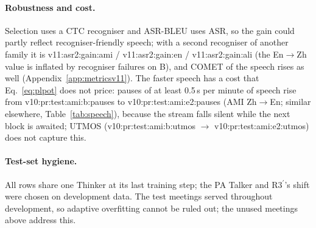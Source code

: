\paragraph{Robustness and cost.}\ifMetricsV{} Selection uses a CTC recogniser and ASR-BLEU uses ASR, so the gain could
partly reflect recogniser-friendly speech; with a second recogniser of another family it is
\num{v11:asr2:gain:ami} / \num{v11:asr2:gain:en} / \num{v11:asr2:gain:ali} (the En$\rightarrow$Zh value is inflated by
recogniser failures on B), and COMET of the speech rises as well (Appendix~\ref{app:metricsv11}).\fi{} The faster
speech has a cost that Eq.~\eqref{eq:plpot} does not price: pauses of at least 0.5\,s per minute of speech rise from
\num{v10:pr:test:ami:b:pauses} to \num{v10:pr:test:ami:e2:pauses} (AMI Zh$\rightarrow$En; similar elsewhere,
Table~\ref{tab:speech}), because the stream falls silent while the next block is awaited; UTMOS
(\num{v10:pr:test:ami:b:utmos} $\rightarrow$ \num{v10:pr:test:ami:e2:utmos}) does not capture this.

\paragraph{Test-set hygiene.}
\label{sec:res-hygiene}
All rows share one Thinker at its last training step; the PA Talker and R3$^\prime$'s shift were chosen on
development data. The test meetings served throughout development, so adaptive overfitting cannot be ruled
out\ifAliEval{}; the unused meetings above address this\fi.
